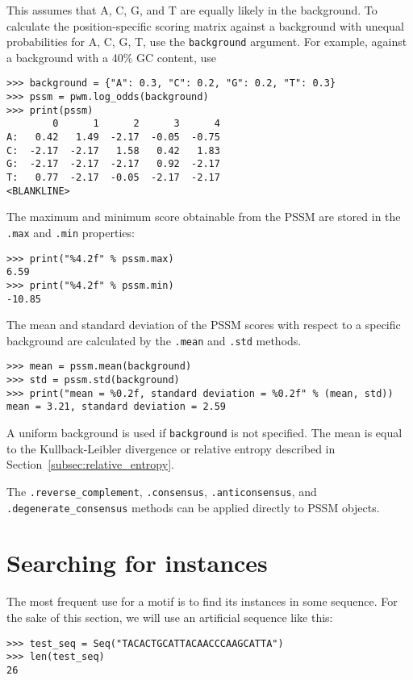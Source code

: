 This assumes that A, C, G, and T are equally likely in the background. To
calculate the position-specific scoring matrix against a background with
unequal probabilities for A, C, G, T, use the \verb+background+ argument.
For example, against a background with a 40\% GC content, use

\begin{verbatim}
>>> background = {"A": 0.3, "C": 0.2, "G": 0.2, "T": 0.3}
>>> pssm = pwm.log_odds(background)
>>> print(pssm)
        0      1      2      3      4
A:   0.42   1.49  -2.17  -0.05  -0.75
C:  -2.17  -2.17   1.58   0.42   1.83
G:  -2.17  -2.17  -2.17   0.92  -2.17
T:   0.77  -2.17  -0.05  -2.17  -2.17
<BLANKLINE>
\end{verbatim}

The maximum and minimum score obtainable from the PSSM are stored in the
\verb+.max+ and \verb+.min+ properties:

\begin{verbatim}
>>> print("%4.2f" % pssm.max)
6.59
>>> print("%4.2f" % pssm.min)
-10.85
\end{verbatim}

The mean and standard deviation of the PSSM scores with respect to a specific
background are calculated by the \verb+.mean+ and \verb+.std+ methods.

\begin{verbatim}
>>> mean = pssm.mean(background)
>>> std = pssm.std(background)
>>> print("mean = %0.2f, standard deviation = %0.2f" % (mean, std))
mean = 3.21, standard deviation = 2.59
\end{verbatim}
A uniform background is used if \verb+background+ is not specified.
The mean is equal to the Kullback-Leibler divergence or relative entropy described in Section~\ref{subsec:relative_entropy}.

The \verb+.reverse_complement+, \verb+.consensus+, \verb+.anticonsensus+, and
\verb+.degenerate_consensus+ methods can be applied directly to PSSM objects.

\section{Searching for instances}
\label{sec:search}

The most frequent use for a motif is to find its instances in some
sequence. For the sake of this section, we will use an artificial sequence like this:

\begin{verbatim}
>>> test_seq = Seq("TACACTGCATTACAACCCAAGCATTA")
>>> len(test_seq)
26
\end{verbatim}

